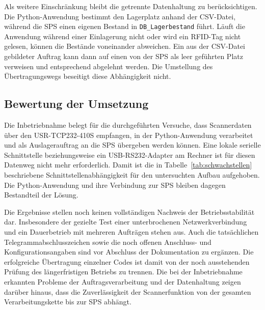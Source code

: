 Als weitere Einschränkung bleibt die getrennte Datenhaltung zu berücksichtigen. Die Python-Anwendung bestimmt den Lagerplatz anhand der CSV-Datei, während die SPS einen eigenen Bestand in \texttt{DB\_Lagerbestand} führt. Läuft die Anwendung während einer Einlagerung nicht oder wird ein RFID-Tag nicht gelesen, können die Bestände voneinander abweichen. Ein aus der CSV-Datei gebildeter Auftrag kann dann auf einen von der SPS als leer geführten Platz verweisen und entsprechend abgelehnt werden. Die Umstellung des Übertragungswegs beseitigt diese Abhängigkeit nicht.

\subsection{Bewertung der Umsetzung}
\label{sec:qr_fazit}

Die Inbetriebnahme belegt für die durchgeführten Versuche, dass Scannerdaten über den USR-TCP232-410S empfangen, in der Python-Anwendung verarbeitet und als Auslagerauftrag an die SPS übergeben werden können. Eine lokale serielle Schnittstelle beziehungsweise ein USB-RS232-Adapter am Rechner ist für diesen Datenweg nicht mehr erforderlich. Damit ist die in Tabelle~\ref{tab:schwachstellen} beschriebene Schnittstellenabhängigkeit für den untersuchten Aufbau aufgehoben. Die Python-Anwendung und ihre Verbindung zur SPS bleiben dagegen Bestandteil der Lösung.

Die Ergebnisse stellen noch keinen vollständigen Nachweis der Betriebsstabilität dar. Insbesondere der gezielte Test einer unterbrochenen Netzwerkverbindung und ein Dauerbetrieb mit mehreren Aufträgen stehen aus. Auch die tatsächlichen Telegrammabschlusszeichen sowie die noch offenen Anschluss- und Konfigurationsangaben sind vor Abschluss der Dokumentation zu ergänzen. Die erfolgreiche Übertragung einzelner Codes ist damit von der noch ausstehenden Prüfung des längerfristigen Betriebs zu trennen. Die bei der Inbetriebnahme erkannten Probleme der Auftragsverarbeitung und der Datenhaltung zeigen darüber hinaus, dass die Zuverlässigkeit der Scannerfunktion von der gesamten Verarbeitungskette bis zur SPS abhängt.
